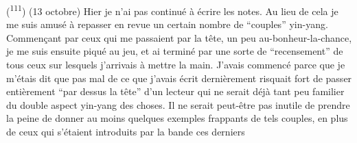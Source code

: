 (\textsuperscript{111}) (13 octobre) Hier je n'ai pas continué à écrire les notes. Au lieu de cela je me suis amusé à repasser en revue un certain nombre de ``couples'' yin-yang. Commençant par ceux qui me passaient par la tête, un peu au-bonheur-la-chance, je me suis ensuite piqué au jeu, et ai terminé par une sorte de ``recensement'' de tous ceux sur lesquels j'arrivais à mettre la main. J'avais commencé parce que je m'étais dit que pas mal de ce que j'avais écrit dernièrement risquait fort de passer entièrement ``par dessus la tête'' d'un lecteur qui ne serait déjà tant  peu familier du double aspect yin-yang des choses. Il ne serait peut-être pas inutile de prendre la peine de donner au moins quelques exemples frappants de tels couples, en plus de ceux qui s'étaient introduits par la bande ces derniers
